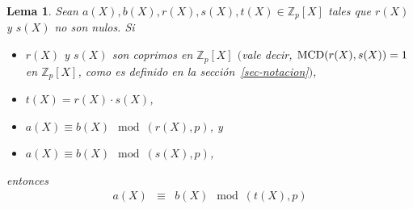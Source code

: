 \documentclass[10pt]{article}
\newcommand{\0}{\mathbf{0}}
\newcommand{\1}{\mathbf{1}}
\newcommand{\modl}{\mod}
\newcommand{\MCD}{{\rm MCD}}
\newcommand{\+}{\oplus}
\newcommand{\comentarioin}[1]{}
\newtheorem{lemma}[theorem]{Lema}
\theoremstyle{remark}
\theoremstyle{remark}
\begin{document}
	\begin{lemma}\label{lema-a}
		Sean $a(X),b(X),r(X),s(X),t(X)\in \mathbb{Z}_p[X]$ tales que $r(X)$ y $s(X)$ no son nulos. Si
		\begin{itemize}
			\item[(i)] $r(X)$ y $s(X)$ son coprimos en $\mathbb{Z}_p[X]$ $($vale decir, $\MCD(r(X),s(X)) = 1$ en $\mathbb{Z}_p[X]$, como es definido en la sección~\ref{sec-notacion}$)$,
			
			\item[(ii)] $t(X)= r(X)\cdot s(X)$,
			\item[(iii)] $a(X)\equiv b(X)\modl (r(X),p)$, y
			\item[(iv)] $a(X)\equiv b(X)\modl (s(X),p)$,
		\end{itemize}
		entonces
		\begin{eqnarray}
			a(X)&\equiv &b(X)\modl (t(X),p) \nonumber 
		\end{eqnarray}
	\end{lemma}
\end{document}
